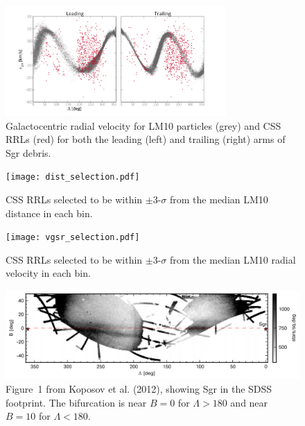 \documentclass[letterpaper,12pt,preprint]{aastex}
\begin{document}
\begin{figure}
\begin{center}
\includegraphics[width=0.75\textwidth]{catalina_all_vgsr.pdf}
\caption{ Galactocentric radial velocity for LM10 particles (grey) and CSS RRLs (red) for both the leading (left) and trailing (right) arms of Sgr debris. }\label{fig:css_vgsr}
\end{center}
\end{figure}

\begin{figure}
\begin{center}
\texttt{[image: dist\_selection.pdf]}
\caption{  CSS RRLs selected to be within $\pm$3-$\sigma$ from the median LM10 distance in each bin. }\label{fig:dist_selection}
\end{center}
\end{figure}

\begin{figure}
\begin{center}
\texttt{[image: vgsr\_selection.pdf]}
\caption{ CSS RRLs selected to be within $\pm$3-$\sigma$ from the median LM10 radial velocity in each bin. }\label{fig:vgsr_selection}
\end{center}
\end{figure}

\begin{figure}
\begin{center}
\includegraphics[width=\textwidth]{koposov.png}
\caption{ Figure~1 from Koposov et al. (2012), showing Sgr in the SDSS footprint. The bifurcation is near $B=0$ for $\Lambda>180$ and near $B=10$ for $\Lambda<180$. }\label{fig:koposov}
\end{center}
\end{figure}
\end{document}
